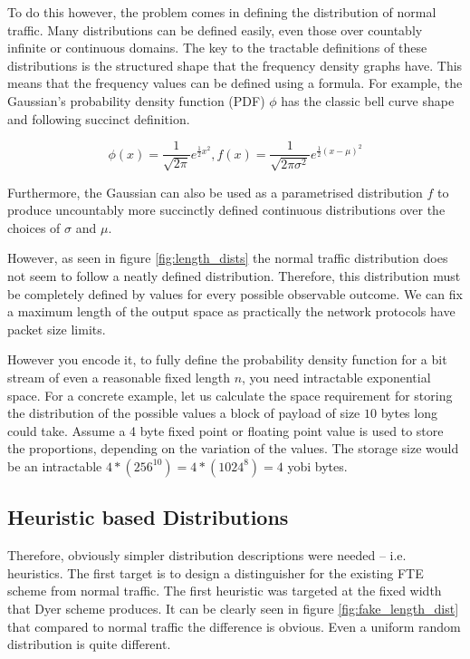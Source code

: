 \documentclass[ %
                    author={Samuel Russell},
                supervisor={Prof. Bogdan Warinschi},
                    degree={MEng},
                     title={Innocuous Ciphertexts},
                  subtitle={The DE-CENSOR Scheme},
                      type={research},
                      year={2018} ]{dissertation}
\begin{document}
To do this however, the problem comes in defining the distribution of normal traffic.
Many distributions can be defined easily, even those over countably infinite or continuous domains.
The key to the tractable definitions of these distributions is the structured shape that the frequency density graphs have.
This means that the frequency values can be defined using a formula.
For example, the Gaussian's probability density function (PDF) $\phi$ has the classic bell curve shape and following succinct definition.

$$\phi (x) = \frac{1}{\sqrt{2\pi}}e^{\frac{1}{2}x^2}, f(x) = \frac{1}{\sqrt{2\pi\sigma^2}}e^{\frac{1}{2}(x-\mu)^2}$$

Furthermore, the Gaussian can also be used as a parametrised distribution $f$ to produce uncountably more succinctly defined continuous distributions over the choices of $\sigma$ and $\mu$.

However, as seen in figure \ref{fig:length_dists} the normal traffic distribution does not seem to follow a neatly defined distribution.
Therefore, this distribution must be completely defined by values for every possible observable outcome.
We can fix a maximum length of the output space as practically the network protocols have packet size limits. 

However you encode it, to fully define the probability density function for a bit stream of even a reasonable fixed length $n$, you need intractable exponential space.
For a concrete example, let us calculate the space requirement for storing the distribution of the possible values a block of payload of size $10$ bytes long could take.
Assume a 4 byte fixed point or floating point value is used to store the proportions, depending on the variation of the values.
The storage size would be an intractable $4*(256^10) = 4*(1024^8) = 4$ yobi bytes.

\subsection{Heuristic based Distributions}

Therefore, obviously simpler distribution descriptions were needed -- i.e. heuristics.
The first target is to design a distinguisher for the existing FTE scheme from normal traffic.
The first heuristic was targeted at the fixed width that Dyer scheme produces.
It can be clearly seen in figure \ref{fig:fake_length_dist} that compared to normal traffic the difference is obvious.
Even a uniform random distribution is quite different.
\end{document}
